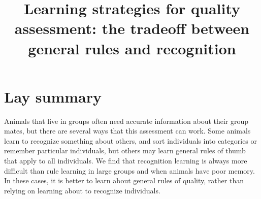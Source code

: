








\noindent
\title{Learning strategies for quality assessment: the tradeoff between general rules and recognition} 
\author{}
\date{} 
\maketitle


\linenumbers

\section*{Lay summary}
Animals that live in groups often need accurate information about their group mates, but there are several ways that this assessment can work. Some animals learn to recognize something about others, and sort individuals into categories or remember particular individuals, but others may learn general rules of thumb that apply to all individuals. We find that recognition learning is always more difficult than rule learning in large groups and when animals have poor memory. In these cases, it is better to learn about general rules of quality, rather than relying on learning about to recognize individuals.



